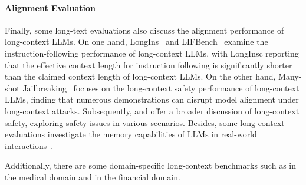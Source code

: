 \paragraph{Alignment Evaluation} Finally, some long-text evaluations also discuss the alignment performance of long-context LLMs. On one hand, LongIns~\citep{gavin2024longins} and LIFBench~\citep{wu2024lifbench} examine the instruction-following performance of long-context LLMs, with LongInsc\citep{gavin2024longins} reporting that the effective context length for instruction following is significantly shorter than the claimed context length of long-context LLMs. On the other hand, Many-shot Jailbreaking~\citep{anil2024many} focuses on the long-context safety performance of long-context LLMs, finding that numerous demonstrations can disrupt model alignment under long-context attacks. Subsequently, \citet{huang2024longsafetybench} and \citet{roberts2024needle} offer a broader discussion of long-context safety, exploring safety issues in various scenarios. Besides, some long-context evaluations investigate the memory capabilities of LLMs in real-world interactions~\citep{thonet2024elitr,wu2024longmemeval}. 

Additionally, there are some domain-specific long-context benchmarks such as \citet{hosseini2024benchmark} in the medical domain and \citet{reddy2024docfinqa} in the financial domain.





